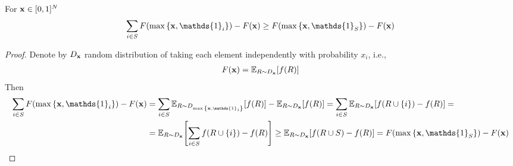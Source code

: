 \begin{lemma}
	For $\vb{x}\in [0,1]^N$
	\begin{align}
	\sum_{i \in S} F\qty(\max\qty{\vb{x}, \mathds{1}_i})-F(\vb{x}) \geq F\qty(\max\qty{\vb{x}, \mathds{1}_{S}})-F(\vb{x})
	\end{align}
	\begin{proof}
		Denote by $D_{\vb{x}}$ random distribution of taking each element independently with probability $x_i$, i.e.,
		\begin{align}
		F(\vb{x}) = \mathbb{E}_{R\sim D_{\vb{x}}} [f(R)]
		\end{align}
		Then
		\begin{align}
		\sum_{i \in S} F\qty(\max\qty{\vb{x}, \mathds{1}_i})-F(\vb{x}) &= \sum_{i \in S} \mathbb{E}_{R\sim D_{\max\qty{\vb{x}, \mathds{1}_i}}} [f(R)] - \mathbb{E}_{R\sim D_{\vb{x}}} [f(R)] = \sum_{i \in S}\mathbb{E}_{R\sim D_{\vb{x}}}\qty[f(R\cup \qty{i}) - f(R)] =\\&= \mathbb{E}_{R\sim D_{\vb{x}}}\qty[\sum_{i \in S} f(R\cup \qty{i}) - f(R)] \geq \mathbb{E}_{R\sim D_{\vb{x}}}\qty[f(R\cup S) - f(R)] = F\qty(\max\qty{\vb{x}, \mathds{1}_{S}})-F(\vb{x})
		\end{align}
	\end{proof}
\end{lemma}
